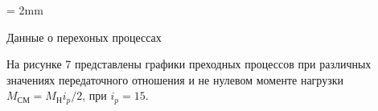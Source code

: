 \documentclass[a4paper, 12pt]{article}
\begin{document}
\begin{table}[h]
	\tabulinesep = 2mm
	\centering
    \begin{threeparttable}
        \caption{Данные о перехоных процессах }
    \end{threeparttable}
\end{table}
\newpage
На рисунке 7 представлены графики преходных процессов при различных значениях передаточного отношения и не нулевом моменте нагрузки $M_\text{СМ} = M_\text{Н}i_p/2$, при $i_p = 15$.
\end{document}
